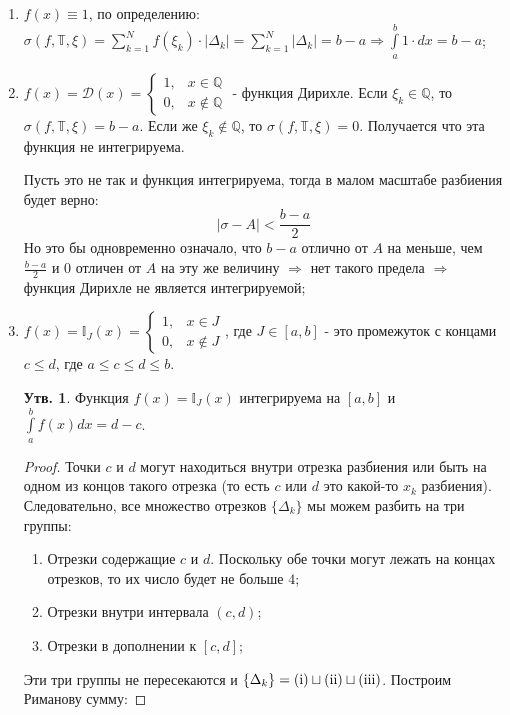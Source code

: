 \documentclass[12pt]{article}
\newcommand{\RN}[1]{%
	\textup{\uppercase\expandafter{\romannumeral#1}}%
}
\newcommand{\MQ}{\mathbb{Q}}
\newcommand{\MTB}{\mathbb{T}}
\theoremstyle{definition}
\newtheorem{prop}{Утв.}
\newcommand{\ddint}[2]{\displaystyle\int\limits_{#1}^{#2}}
\begin{document}
\begin{enumerate}[label={\arabic*)}]
	\item $f(x) \equiv 1$, по определению: $\sigma(f, \MTB, \xi) = \displaystyle \sum\limits_{k = 1}^{N}f(\xi_k){\cdot}|\Delta_k| =  \displaystyle \sum\limits_{k = 1}^{N}|\Delta_k| = b -a \Rightarrow \ddint{a}{b}1{\cdot}dx = b-a$; 
	\item $f(x) = \mathcal{D}(x)= 
	\begin{cases} 
		1, & x \in \mathbb{Q} \\
		0, & x \notin \mathbb{Q} 
	\end{cases}$ - функция Дирихле. Если $\xi_k \in \MQ$, то $\sigma(f, \MTB, \xi) = b - a$. Если же $\xi_k \notin \MQ$, то $\sigma(f, \MTB, \xi) = 0$. Получается что эта функция не интегрируема. 

	Пусть это не так и функция интегрируема, тогда в малом масштабе разбиения будет верно: 
	$$
		|\sigma - A| < \dfrac{b-a}{2}
	$$ 
	Но это бы одновременно означало, что $b-a$ отлично от $A$ на меньше, чем $\tfrac{b-a}{2}$ и $0$ отличен от $A$ на эту же величину $\Rightarrow$ нет такого предела $\Rightarrow$ функция Дирихле не является интегрируемой;
	\item $f(x) = \mathbb{I}_J(x)= 
	\begin{cases} 
		1, & x \in J \\
		0, & x \notin J 
	\end{cases}$, где $J \in [a,b]$ - это промежуток с концами $c \leq d$, где $a \leq c \leq d \leq b$.
	\begin{prop}
		Функция $f(x) = \mathbb{I}_J(x)$ интегрируема на $[a,b]$ и $\ddint{a}{b}f(x)dx = d - c$.
	\end{prop}
	\begin{proof}
		Точки $c$ и $d$ могут находиться внутри отрезка разбиения или быть на одном из концов такого отрезка (то есть $c$ или $d$ это какой-то $x_k$ разбиения).
		Следовательно, все множество отрезков $\{\Delta_k\}$ мы можем разбить на три группы:
		\begin{enumerate}[label={(\Roman*)}]
			\item Отрезки содержащие $c$ и $d$. Поскольку обе точки могут лежать на концах отрезков, то их число будет не больше $4$;
			\item Отрезки внутри интервала $(c,d)$;
			\item Отрезки в дополнении к $[c,d]$;
		\end{enumerate}
		Эти три группы не пересекаются и $\{\Delta_k\} = (\RN{1}) \sqcup (\RN{2}) \sqcup (\RN{3})$. Построим Риманову сумму:

\end{proof}
\end{enumerate}
\end{document}
